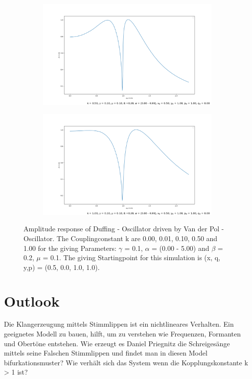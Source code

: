 \documentclass[oneside,10pt,a4paper]{report}
\begin{document}
\begin{figure}[H]
\begin{subfigure}[b]{0.45\textwidth}
			\caption{}
			\label{fig:resonanz3}
		\end{subfigure}
		\hfill
		\begin{subfigure}[b]{0.45\textwidth}
			\includegraphics[width=\textwidth]{resonanz4.png}
			\caption{}
			\label{fig: resonanz4}
		\end{subfigure}
		\begin{subfigure}[b]{0.45\textwidth}
			\includegraphics[width=\textwidth]{resonanz5.png}
			\caption{}
			\label{fig:resonanz5}
		\end{subfigure}
		
		\caption{Amplitude response of Duffing - Oscillator driven by Van der Pol - Oscillator. The Couplingconstant k are 0.00, 0.01, 0.10, 0.50 and 1.00 for the giving Parameters: $\gamma$ = 0.1, $\alpha$ = (0.00 - 5.00) and $\beta$ = 0.2, $\mu$ = 0.1. The giving Startingpoint for this simulation is (x, q, y,p) = (0.5, 0.0, 1.0, 1.0).}
		\label{fig:resonanz}
	\end{figure}
		
		
	\chapter{Outlook}	
		Die Klangerzeugung mittels Stimmlippen ist ein nichtlineares Verhalten. Ein geeignetes Modell zu bauen, hilft, um zu verstehen wie Frequenzen, Formanten und Obertöne entstehen.
		Wie erzeugt es Daniel Priegnitz die Schreigesänge mittels seine Falschen Stimmlippen und findet man in diesen Model bifurkationsmuster?
		Wie verhält sich das System wenn die Kopplungskonstante k > 1 ist? 
	
	\nocite{*}
	
	\newpage
\end{document}

